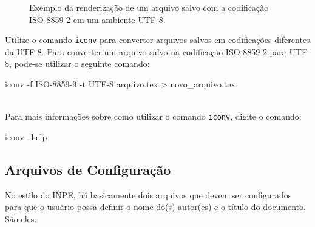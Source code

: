 \begin{figure}[H]
\caption{Exemplo da renderização de um arquivo salvo com a codificação ISO-8859-2 em um ambiente UTF-8.}
\label{fig:leiame}
\end{figure}

%

\begin{marker}
Utilize o comando {\tt iconv} para converter arquivos salvos em codificações diferentes da UTF-8. Para converter um arquivo salvo na codificação ISO-8859-2 para UTF-8, pode-se utilizar o seguinte comando:\\
\begin{commandshell}
iconv -f ISO-8859-9 -t UTF-8 arquivo.tex > novo_arquivo.tex
\end{commandshell}
\\
Para mais informações sobre como utilizar o comando {\tt iconv}, digite o comando:\\
\begin{commandshell}
iconv --help
\end{commandshell}
\end{marker}

\subsection{Arquivos de Configuração}
\label{sec:configura}

No estilo do INPE, há basicamente dois arquivos que devem ser configurados para que o usuário possa definir o nome do(s) autor(es) e o título do documento. São eles:

